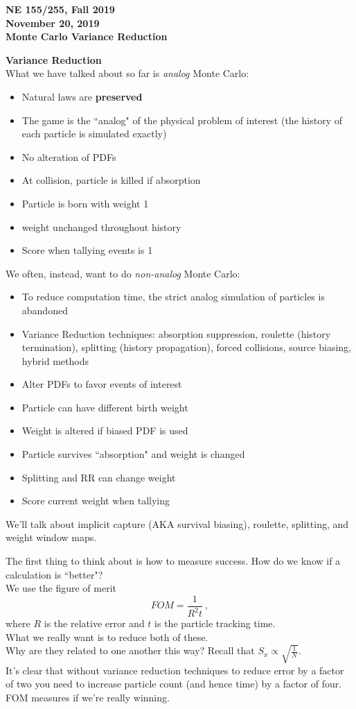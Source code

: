 \documentclass[12pt]{article}
\begin{document}
\begin{center}
{\bf NE 155/255, Fall 2019\\
November 20, 2019 \\
Monte Carlo Variance Reduction
}
\end{center}

\textbf{Variance Reduction}\\
What we have talked about so far is \textit{analog} Monte Carlo:
\begin{itemize}
    \item Natural laws are \textbf{preserved}
    \item The game is the ``analog" of the physical problem of interest (the history of each particle is simulated exactly)
    \item No alteration of PDFs
    \item At collision, particle is killed if absorption
    \item Particle is born with weight 1
    \item weight unchanged throughout history
    \item Score when tallying events is 1
\end{itemize}
%
We often, instead, want to do \textit{non-analog} Monte Carlo:
\begin{itemize}
    \item To reduce computation time, the strict analog simulation of particles is abandoned
    \item Variance Reduction techniques: absorption suppression, roulette (history termination), splitting (history propagation), forced collisions, source biasing, hybrid methods
    \item Alter PDFs to favor events of interest
    \item Particle can have different birth weight
    \item Weight is altered if biased PDF is used
    \item Particle survives ``absorption" and weight is changed
    \item Splitting and RR can change weight
    \item Score current weight when tallying
\end{itemize}
%
We'll talk about implicit capture (AKA survival biasing), roulette, splitting, and weight window maps. 

The first thing to think about is how to measure success. How do we know if a calculation is ``better"?\\
We use the figure of merit
\[
FOM =\frac{1}{R^2 t}\:,
\]
where $R$ is the relative error and $t$ is the particle tracking time.\\
What we really want is to reduce both of these. \\
Why are they related to one another this way? Recall that $S_x \propto \sqrt{\frac{1}{N}}$.\\
It's clear that without variance reduction techniques to reduce error by a factor of two you need to increase particle count (and hence time) by a factor of four.\\
FOM measures if we're really winning.
\end{document}
